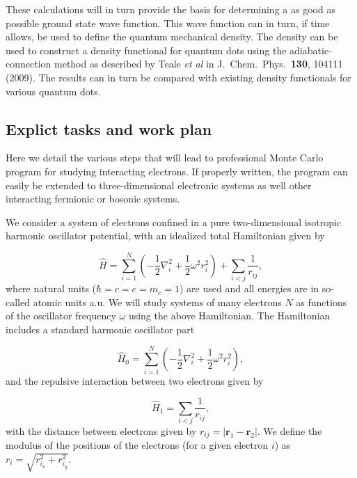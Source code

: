 \documentclass[oneside,final,a4wide,10pt]{article}
\begin{document}
These calculations will in turn provide the basis for determining a as good as possible
ground state wave function. This wave function can  in turn, if time allows,  be used to define the quantum
mechanical density.  The density can be used to construct a density functional for quantum dots
using the adiabatic-connection method as described by Teale {\em et al} in J.~Chem.~Phys.~{\bf 130},
104111 (2009).  The results can in turn  be compared with existing density functionals for various quantum dots.



\subsection*{Explict tasks and work plan}

Here we detail the various steps that will lead to professional Monte Carlo program for studying 
interacting electrons. If properly written, the program can easily be extended to three-dimensional electronic systems as well other interacting fermionic or bosonic systems. 

We consider a system of electrons confined in a pure two-dimensional 
isotropic harmonic oscillator potential, with an idealized  total Hamiltonian given by

\begin{equation}
\label{eq:finalH}
\hat{H}=\sum_{i=1}^{N} \left(  -\frac{1}{2} \nabla_i^2 + \frac{1}{2} \omega^2r_i^2  \right)+\sum_{i<j}\frac{1}{r_{ij}},
\end{equation}
where natural units ($\hbar=c=e=m_e=1$) are used and all energies are in so-called atomic units a.u. We will study systems of many electrons $N$ as functions of the oscillator frequency  $\omega$ using the above Hamiltonian.  The Hamiltonian includes a standard harmonic oscillator part

\begin{equation}
\hat{H}_0=\sum_{i=1}^{N} \left(  -\frac{1}{2} \nabla_i^2 + \frac{1}{2} \omega^2r_i^2  \right),
\end{equation}
and the repulsive interaction between two electrons given by

\begin{equation}
\hat{H}_1=\sum_{i<j}\frac{1}{r_{ij}},
\end{equation}
with the distance between electrons given by $r_{ij}=\vert \bm{r}_1-\bm{r}_2\vert$. We define the 
modulus of the positions of the electrons (for a given electron $i$) as $r_i = \sqrt{r_{i_x}^2+r_{i_y}^2}$.
\end{document}
